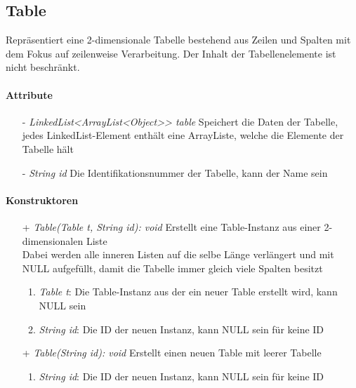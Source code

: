 \subsection{Table}

Repräsentiert eine 2-dimensionale Tabelle bestehend aus Zeilen und Spalten mit dem Fokus auf zeilenweise Verarbeitung. Der Inhalt der Tabellenelemente ist nicht beschränkt.


\paragraph{Attribute}

\begin{itemize}
	\item[-] \textit{LinkedList<ArrayList<Object>> table} Speichert die Daten der Tabelle, jedes LinkedList-Element enthält eine ArrayListe, welche die Elemente der Tabelle hält
	\item[-] \textit{String id}	Die Identifikationsnummer der Tabelle, kann der Name sein
\end{itemize}

\paragraph{Konstruktoren}

\begin{itemize}
	\item[+] \textit{Table(Table t, String id): void} Erstellt eine Table-Instanz aus einer 2-dimensionalen Liste \\
	Dabei werden alle inneren Listen auf die selbe Länge verlängert und mit NULL aufgefüllt, damit die Tabelle immer gleich viele Spalten besitzt
	\begin{enumerate}
		\item \textit{Table t}: Die Table-Instanz aus der ein neuer Table erstellt wird, kann NULL sein
		\item \textit{String id}: Die ID der neuen Instanz, kann NULL sein für keine ID
	\end{enumerate}

	\item[+] \textit{Table(String id): void} Erstellt einen neuen Table mit leerer Tabelle
	\begin{enumerate}
		\item \textit{String id}: Die ID der neuen Instanz, kann NULL sein für keine ID
	\end{enumerate}
\end{itemize}	
	
